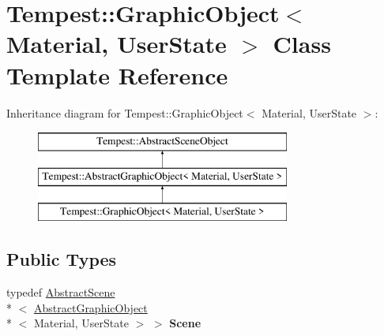 \hypertarget{class_tempest_1_1_graphic_object}{\section{Tempest\+:\+:Graphic\+Object$<$ Material, User\+State $>$ Class Template Reference}
\label{class_tempest_1_1_graphic_object}
}
Inheritance diagram for Tempest\+:\+:Graphic\+Object$<$ Material, User\+State $>$\+:\begin{figure}[H]
\begin{center}
\leavevmode
\includegraphics[height=3.000000cm]{class_tempest_1_1_graphic_object}
\end{center}
\end{figure}
\subsection*{Public Types}
\begin{DoxyCompactItemize}
\item 
\hypertarget{class_tempest_1_1_graphic_object_a27920036e893aa5e9a7f85ad7316f562}{typedef \hyperlink{class_tempest_1_1_abstract_scene}{Abstract\+Scene}\\*
$<$ \hyperlink{class_tempest_1_1_abstract_graphic_object}{Abstract\+Graphic\+Object}\\*
$<$ Material, User\+State $>$ $>$ {\bfseries Scene}}\label{class_tempest_1_1_graphic_object_a27920036e893aa5e9a7f85ad7316f562}

\end{DoxyCompactItemize}
